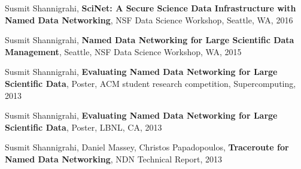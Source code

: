 \begin{etaremune}
\item Susmit Shannigrahi, \textbf{SciNet: A Secure Science Data Infrastructure with Named Data Networking}, NSF Data Science Workshop, Seattle, WA, 2016

\item Susmit Shannigrahi, \textbf{Named Data Networking for Large Scientific Data Management}, Seattle, NSF Data Science Workshop, WA, 2015

\item Susmit Shannigrahi, \textbf{Evaluating Named Data Networking for Large Scientific Data}, Poster, ACM student research competition, Supercomputing, 2013

\item Susmit Shannigrahi, \textbf{Evaluating Named Data Networking for Large Scientific Data}, Poster, LBNL, CA, 2013

\item Susmit Shannigrahi, Daniel Massey, Christos Papadopoulos,  \textbf{Traceroute for Named Data Networking}, NDN Technical Report, 2013

\end{etaremune}


